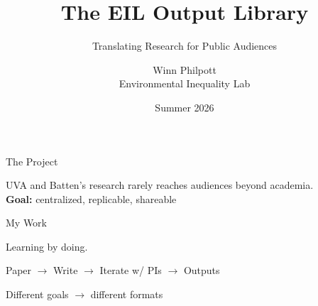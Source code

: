 \documentclass[10pt,aspectratio=169]{beamer}
\title{The EIL Output Library}
\subtitle{Translating Research for Public Audiences}
\author{Winn Philpott \\ Environmental Inequality Lab}
\date{Summer 2026}
\begin{document}
\maketitle

\begin{frame}{The Project}
  \begin{center}
    \Large
    UVA and Batten's research rarely reaches audiences beyond academia.\\[14pt]
    \textbf{Goal:} centralized, replicable, shareable
  \end{center}
\end{frame}

\begin{frame}{My Work}
  \begin{center}
    \large Learning by doing.

    \vspace{10pt}
    \Large
    Paper $\rightarrow$ Write $\rightarrow$ Iterate w/ PIs $\rightarrow$ Outputs

    \vspace{10pt}
    \normalsize Different goals $\rightarrow$ different formats
  \end{center}
\end{frame}
\end{document}
